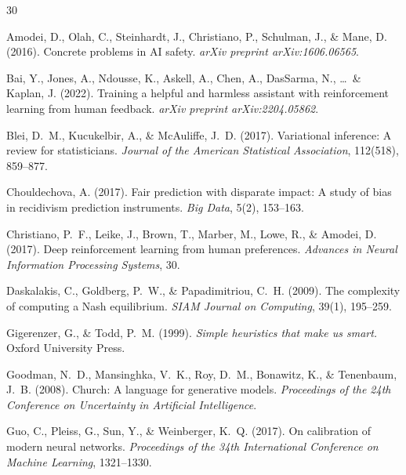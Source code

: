 \documentclass[11pt,a4paper]{article}
\begin{document}
\begin{thebibliography}{30}

Amodei, D., Olah, C., Steinhardt, J., Christiano, P., Schulman, J., \& Mane, D. (2016).
\newblock Concrete problems in AI safety.
\newblock \emph{arXiv preprint arXiv:1606.06565}.

Bai, Y., Jones, A., Ndousse, K., Askell, A., Chen, A., DasSarma, N., \ldots\ \& Kaplan, J. (2022).
\newblock Training a helpful and harmless assistant with reinforcement learning from human feedback.
\newblock \emph{arXiv preprint arXiv:2204.05862}.

Blei, D.~M., Kucukelbir, A., \& McAuliffe, J.~D. (2017).
\newblock Variational inference: A review for statisticians.
\newblock \emph{Journal of the American Statistical Association}, 112(518), 859--877.

Chouldechova, A. (2017).
\newblock Fair prediction with disparate impact: A study of bias in recidivism prediction instruments.
\newblock \emph{Big Data}, 5(2), 153--163.

Christiano, P.~F., Leike, J., Brown, T., Marber, M., Lowe, R., \& Amodei, D. (2017).
\newblock Deep reinforcement learning from human preferences.
\newblock \emph{Advances in Neural Information Processing Systems}, 30.

Daskalakis, C., Goldberg, P.~W., \& Papadimitriou, C.~H. (2009).
\newblock The complexity of computing a Nash equilibrium.
\newblock \emph{SIAM Journal on Computing}, 39(1), 195--259.

Gigerenzer, G., \& Todd, P.~M. (1999).
\newblock \emph{Simple heuristics that make us smart.}
\newblock Oxford University Press.

Goodman, N.~D., Mansinghka, V.~K., Roy, D.~M., Bonawitz, K., \& Tenenbaum, J.~B. (2008).
\newblock Church: A language for generative models.
\newblock \emph{Proceedings of the 24th Conference on Uncertainty in Artificial Intelligence}.

Guo, C., Pleiss, G., Sun, Y., \& Weinberger, K.~Q. (2017).
\newblock On calibration of modern neural networks.
\newblock \emph{Proceedings of the 34th International Conference on Machine Learning}, 1321--1330.


\end{thebibliography}
\end{document}
